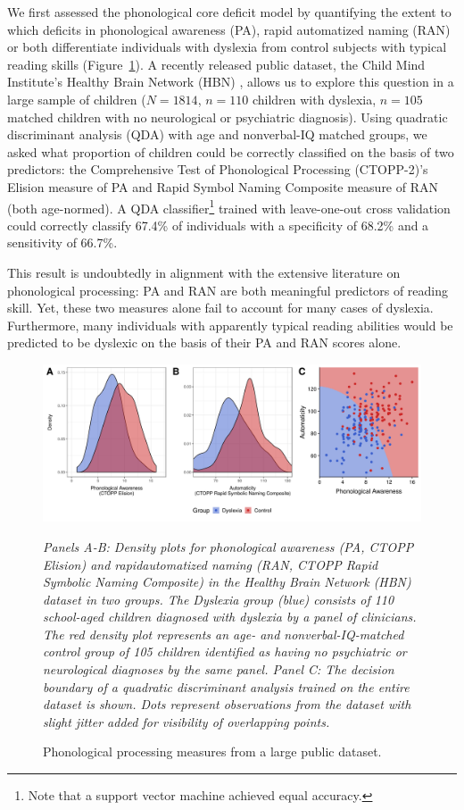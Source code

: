 \documentclass[../uwthesis.tex]{subfiles}
\begin{document}
We first assessed the phonological core deficit model by quantifying the extent to which deficits in phonological awareness (PA), rapid automatized naming (RAN) or both differentiate individuals with dyslexia from control subjects with typical reading skills (Figure~\ref{fig:p3_fig1}). A recently released public dataset, the Child Mind Institute’s Healthy Brain Network (HBN) \cite{Alexander2017DataDisorders}, allows us to explore this question in a large sample of children ($N = 1814$, $n = 110$ children with dyslexia, $n = 105$ matched children with no neurological or psychiatric diagnosis). Using quadratic discriminant analysis (QDA) with age and nonverbal-IQ matched groups, we asked what proportion of children could be correctly classified on the basis of two predictors: the Comprehensive Test of Phonological Processing (CTOPP-2)’s Elision measure of PA and Rapid Symbol Naming Composite measure of RAN (both age-normed). A QDA classifier\footnote{Note that a support vector machine achieved equal accuracy.} trained with leave-one-out cross validation could correctly classify 67.4\% of individuals with a specificity of 68.2\% and a sensitivity of 66.7\%.

This result is undoubtedly in alignment with the extensive literature on phonological
processing: PA and RAN are both meaningful predictors of reading skill. Yet, these two
measures alone fail to account for many cases of dyslexia. Furthermore, many individuals with apparently typical reading abilities would be predicted to be dyslexic on the basis of their PA and RAN scores alone.

\begin{figure}
    \centering
    \caption{Phonological processing measures from a large public dataset.}
    \label{fig:p3_fig1}
    \includegraphics[width=18cm]{images/paper_3/1_HBN_Groups.png}
    \item \textit{Panels A-B: Density plots for phonological awareness (PA, CTOPP Elision) and rapidautomatized naming (RAN, CTOPP Rapid Symbolic Naming Composite) in the Healthy Brain Network (HBN) dataset in two groups. The Dyslexia group (blue) consists of 110 school-aged children diagnosed with dyslexia by a panel of clinicians. The red density plot represents an age- and nonverbal-IQ-matched control group of 105 children identified as having no psychiatric or neurological diagnoses by the same panel. Panel C: The decision boundary of a quadratic discriminant analysis trained on the entire dataset is shown. Dots represent observations from the dataset with slight jitter added for visibility of overlapping points.}

\end{figure}
\end{document}
